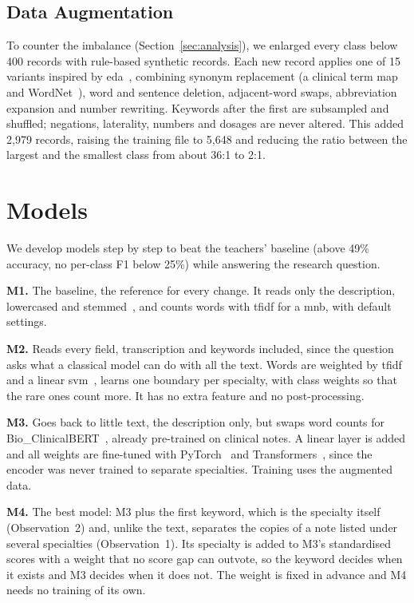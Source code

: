 \documentclass[twocolumn,10pt]{article}
\begin{document}
\subsection{Data Augmentation}
\label{sec:augmentation}

To counter the imbalance (Section~\ref{sec:analysis}), we enlarged every class below 400 records with rule-based synthetic records. Each new record applies one of 15 variants inspired by \ac{eda}~\cite{wei2019eda}, combining synonym replacement (a clinical term map and WordNet~\cite{miller1995wordnet}), word and sentence deletion, adjacent-word swaps, abbreviation expansion and number rewriting. Keywords after the first are subsampled and shuffled; negations, laterality, numbers and dosages are never altered. This added 2{,}979 records, raising the training file to 5{,}648 and reducing the ratio between the largest and the smallest class from about 36:1 to 2:1.

\section{Models}
\label{sec:models}

We develop models step by step to beat the teachers' baseline (above 49\% accuracy, no per-class F1 below 25\%) while answering the research question.

\textbf{M1.} The baseline, the reference for every change. It reads only the description, lowercased and stemmed~\cite{nltk}, and counts words with \ac{tfidf} for a \ac{mnb}, with default settings.

\textbf{M2.} Reads every field, transcription and keywords included, since the question asks what a classical model can do with all the text. Words are weighted by \ac{tfidf} and a linear \ac{svm}~\cite{sklearn}, learns one boundary per specialty, with class weights so that the rare ones count more. It has no extra feature and no post-processing.

\textbf{M3.} Goes back to little text, the description only, but swaps word counts for Bio\_ClinicalBERT~\cite{bioclinicalbert}, already pre-trained on clinical notes. A linear layer is added and all weights are fine-tuned with PyTorch~\cite{pytorch} and Transformers~\cite{transformers}, since the encoder was never trained to separate specialties. Training uses the augmented data.

\textbf{M4.} The best model: M3 plus the first keyword, which is the specialty itself (Observation~2) and, unlike the text, separates the copies of a note listed under several specialties (Observation~1). Its specialty is added to M3's standardised scores with a weight that no score gap can outvote, so the keyword decides when it exists and M3 decides when it does not. The weight is fixed in advance and M4 needs no training of its own.
\end{document}
